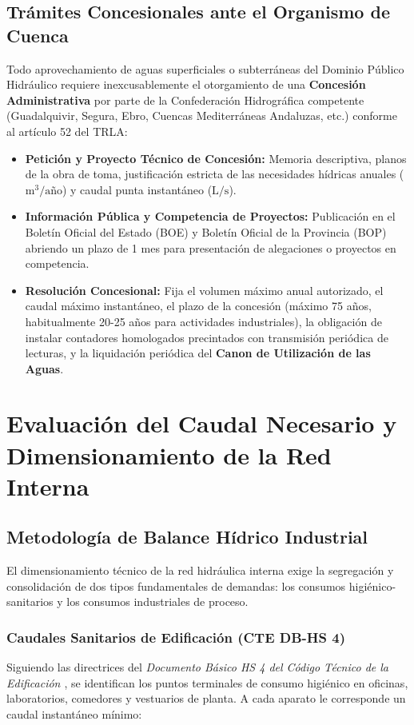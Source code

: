 \documentclass{report}
\begin{document}
\section{Trámites Concesionales ante el Organismo de Cuenca}
Todo aprovechamiento de aguas superficiales o subterráneas del Dominio Público Hidráulico requiere inexcusablemente el otorgamiento de una \textbf{Concesión Administrativa} por parte de la Confederación Hidrográfica competente (Guadalquivir, Segura, Ebro, Cuencas Mediterráneas Andaluzas, etc.) conforme al artículo 52 del TRLA:
\begin{itemize}
    \item \textbf{Petición y Proyecto Técnico de Concesión:} Memoria descriptiva, planos de la obra de toma, justificación estricta de las necesidades hídricas anuales ($\text{m}^3/\text{año}$) y caudal punta instantáneo ($\text{L/s}$).
    \item \textbf{Información Pública y Competencia de Proyectos:} Publicación en el Boletín Oficial del Estado (BOE) y Boletín Oficial de la Provincia (BOP) abriendo un plazo de 1 mes para presentación de alegaciones o proyectos en competencia.
    \item \textbf{Resolución Concesional:} Fija el volumen máximo anual autorizado, el caudal máximo instantáneo, el plazo de la concesión (máximo 75 años, habitualmente 20-25 años para actividades industriales), la obligación de instalar contadores homologados precintados con transmisión periódica de lecturas, y la liquidación periódica del \textbf{Canon de Utilización de las Aguas}.
\end{itemize}

\chapter{Evaluación del Caudal Necesario y Dimensionamiento de la Red Interna}

\section{Metodología de Balance Hídrico Industrial}
El dimensionamiento técnico de la red hidráulica interna exige la segregación y consolidación de dos tipos fundamentales de demandas: los consumos higiénico-sanitarios y los consumos industriales de proceso.

\subsection{Caudales Sanitarios de Edificación (CTE DB-HS 4)}
Siguiendo las directrices del \textit{Documento Básico HS 4 del Código Técnico de la Edificación \cite{CTE_DB_HS4}}, se identifican los puntos terminales de consumo higiénico en oficinas, laboratorios, comedores y vestuarios de planta. A cada aparato le corresponde un caudal instantáneo mínimo:
\end{document}
